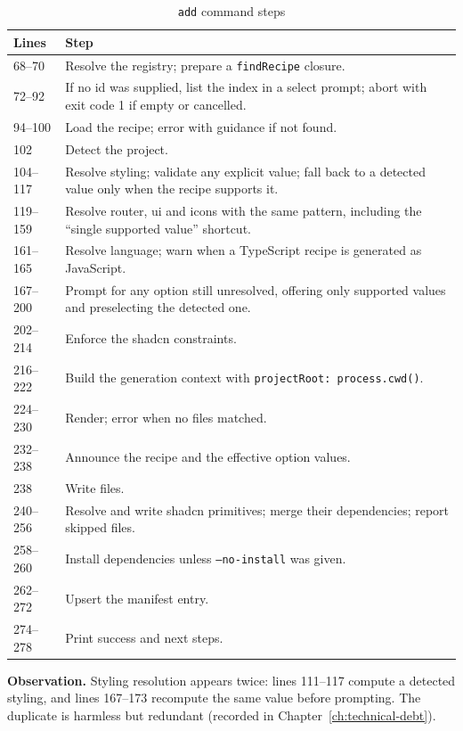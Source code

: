 \begin{longtable}{p{1.5cm}p{12.3cm}}
\caption{\texttt{add} command steps}\\
\toprule
\textbf{Lines} & \textbf{Step} \\
\midrule

68--70 & Resolve the registry; prepare a \texttt{findRecipe} closure. \\
72--92 & If no id was supplied, list the index in a select prompt; abort with exit
code 1 if empty or cancelled. \\
94--100 & Load the recipe; error with guidance if not found. \\
102 & Detect the project. \\
104--117 & Resolve styling; validate any explicit value; fall back to a detected
value only when the recipe supports it. \\
119--159 & Resolve router, ui and icons with the same pattern, including the
``single supported value'' shortcut. \\
161--165 & Resolve language; warn when a TypeScript recipe is generated as
JavaScript. \\
167--200 & Prompt for any option still unresolved, offering only supported values
and preselecting the detected one. \\
202--214 & Enforce the shadcn constraints. \\
216--222 & Build the generation context with \texttt{projectRoot: process.cwd()}. \\
224--230 & Render; error when no files matched. \\
232--238 & Announce the recipe and the effective option values. \\
238 & Write files. \\
240--256 & Resolve and write shadcn primitives; merge their dependencies; report
skipped files. \\
258--260 & Install dependencies unless \texttt{--no-install} was given. \\
262--272 & Upsert the manifest entry. \\
274--278 & Print success and next steps. \\
\bottomrule
\end{longtable}

\textbf{Observation.} Styling resolution appears twice: lines 111--117 compute a
detected styling, and lines 167--173 recompute the same value before prompting.
The duplicate is harmless but redundant (recorded in
Chapter~\ref{ch:technical-debt}).

